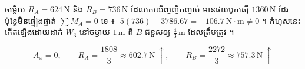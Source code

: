 \documentclass[12pt,a4paper]{article}
\newcommand{\N}{\,\mathrm{N}}
\newcommand{\m}{\,\mathrm{m}}
\begin{document}
\begin{note}
ចម្លើយ $R_A=624\N$ និង $R_B=736\N$ ដែលគេឃើញញឹកញាប់ មានផលបូកស្មើ $1360\N$ ដែរ
ប៉ុន្តែ\textbf{មិន}ផ្ទៀងផ្ទាត់ $\sum M_A=0$ ទេ ៖
$\;5(736)-3786.67=-106.7\ \mathrm{N\cdot m}\neq 0$ ។
កំហុសនេះកើតឡើងដោយដាក់ $W_3$ នៅចម្ងាយ $1\m$ ពី $B$ ជំនួសឲ្យ $\tfrac43\m$ ដែលត្រឹមត្រូវ ។
\end{note}

\begin{answer}
\[
  A_x = 0, \qquad
  R_A = \frac{1808}{3}\approx 602.7\N\ \uparrow, \qquad
  R_B = \frac{2272}{3}\approx 757.3\N\ \uparrow
\]
\end{answer}
\end{document}
